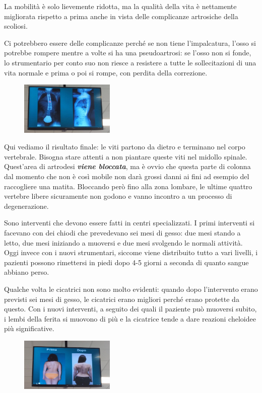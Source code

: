 La mobilità è solo lievemente ridotta, ma la qualità della vita è nettamente migliorata rispetto a prima anche in vista delle complicanze artrosiche della scoliosi.

Ci potrebbero essere delle complicanze perché se non tiene
l'impalcatura, l'osso si potrebbe rompere mentre a volte si ha una pseudoartrosi: se l'osso non si fonde, lo strumentario per conto suo non riesce a resistere a tutte le sollecitazioni di una vita normale e prima o poi si rompe, con perdita della correzione.

\begin{figure}[!ht]
\centering
\includegraphics[width=0.4\textwidth]{013/image15.jpeg}
\end{figure}

Qui vediamo il risultato finale: le viti partono da dietro e terminano nel corpo vertebrale. Bisogna stare attenti a non piantare queste viti nel midollo spinale. Quest'area di artrodesi \textbf{\emph{viene bloccata}}, ma è ovvio che questa parte di colonna dal momento che non è così mobile non darà grossi danni ai fini ad esempio del raccogliere una matita. Bloccando però fino alla zona lombare, le ultime quattro vertebre libere sicuramente non godono e vanno incontro a un processo di degenerazione.

Sono interventi che devono essere fatti in centri specializzati. I primi interventi si facevano con dei chiodi che prevedevano sei mesi di gesso: due mesi stando a letto, due mesi iniziando a muoversi e due mesi
svolgendo le normali attività. Oggi invece con i nuovi strumentari, siccome viene distribuito tutto a vari livelli, i pazienti possono rimettersi in piedi dopo 4-5 giorni a seconda di quanto sangue abbiano perso.

Qualche volta le cicatrici non sono molto evidenti: quando dopo l'intervento erano previsti sei mesi di gesso, le cicatrici erano migliori perché erano protette da questo. Con i nuovi interventi, a seguito dei quali il paziente può muoversi subito, i lembi della ferita si muovono di più e la cicatrice tende a dare reazioni cheloidee più significative.

\begin{figure}[!ht]
\centering
\includegraphics[width=0.4\textwidth]{013/image16.jpeg}
\end{figure}

